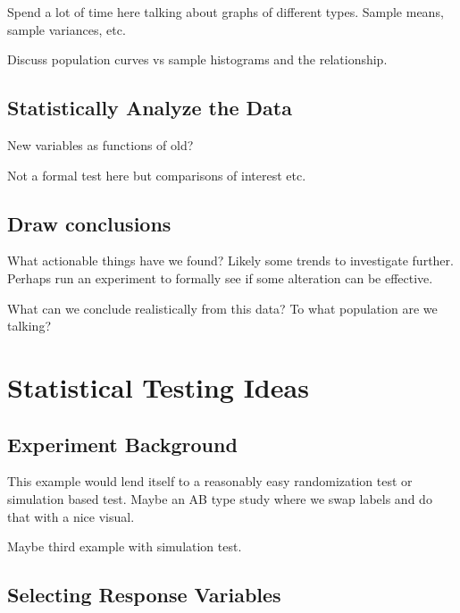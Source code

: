\documentclass[
]{book}
\theoremstyle{definition}
\theoremstyle{definition}
\theoremstyle{definition}
\theoremstyle{remark}
\begin{document}
Spend a lot of time here talking about graphs of different types. Sample means, sample variances, etc.

Discuss population curves vs sample histograms and the relationship.

\hypertarget{statistically-analyze-the-data}{%
\subsection{Statistically Analyze the Data}\label{statistically-analyze-the-data}}

New variables as functions of old?

Not a formal test here but comparisons of interest etc.

\hypertarget{draw-conclusions}{%
\subsection{Draw conclusions}\label{draw-conclusions}}

What actionable things have we found? Likely some trends to investigate further. Perhaps run an experiment to formally see if some alteration can be effective.

What can we conclude realistically from this data? To what population are we talking?

\hypertarget{statistical-testing-ideas}{%
\section{Statistical Testing Ideas}\label{statistical-testing-ideas}}

\hypertarget{experiment-background-1}{%
\subsection{Experiment Background}\label{experiment-background-1}}

This example would lend itself to a reasonably easy randomization test or simulation based test. Maybe an AB type study where we swap labels and do that with a nice visual.

Maybe third example with simulation test.

\hypertarget{selecting-response-variables-1}{%
\subsection{Selecting Response Variables}\label{selecting-response-variables-1}}
\end{document}
